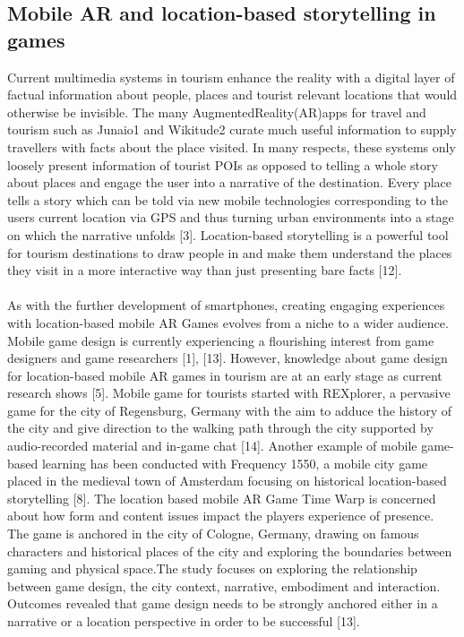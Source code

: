 \subsection{Mobile AR and location-based storytelling in games }
Current multimedia systems in tourism enhance the reality with a digital layer of factual information about people, places and tourist relevant locations that would otherwise be invisible. The many AugmentedReality(AR)apps for travel and tourism such as Junaio1 and Wikitude2 curate much useful information to supply travellers with facts about the place visited. In many respects, these systems only loosely present information of tourist POIs as opposed to telling a whole story about places and engage the user into a narrative of the destination. Every place tells a story which can be told via new mobile technologies corresponding to the users current location via GPS and thus turning urban environments into a stage on which the narrative unfolds [3]. Location-based storytelling is a powerful tool for tourism destinations to draw people in and make them understand the places they visit in a more interactive way than just presenting bare facts [12]. 
\paragraph{}As with the further development of smartphones, creating engaging experiences with location-based mobile AR Games evolves from a niche to a wider audience. Mobile game design is currently experiencing a ﬂourishing interest from game designers and game researchers [1], [13]. However, knowledge about game design for location-based mobile AR games in tourism are at an early stage as current research shows [5]. Mobile game for tourists started with REXplorer, a pervasive game for the city of Regensburg, Germany with the aim to adduce the history of the city and give direction to the walking path through the city supported by audio-recorded material and in-game chat [14]. Another example of mobile game-based learning has been conducted with Frequency 1550, a mobile city game placed in the medieval town of Amsterdam focusing on historical location-based storytelling [8]. The location based mobile AR Game Time Warp is concerned about how form and content issues impact the players experience of presence. The game is anchored in the city of Cologne, Germany, drawing on famous characters and historical places of the city and exploring the boundaries between gaming and physical space.The study focuses on exploring the relationship between game design, the city context, narrative, embodiment and interaction. Outcomes revealed that game design needs to be strongly anchored either in a narrative or a location perspective in order to be successful [13]. 
